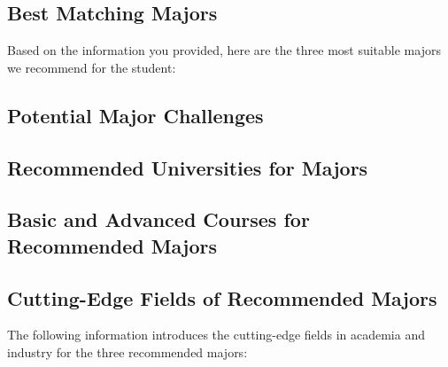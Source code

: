 \documentclass[12pt]{article}
\begin{document}
\begin{CJK*}{UTF8}{gbsn}
\newpage
\hspace{0pt}
\vspace{0cm}
\subsection*{Best Matching Majors}
Based on the information you provided, here are the three most suitable majors we recommend for the student:

\textbf{} %

\newpage
\hspace{0pt}
\vspace{0cm}
\subsection*{Potential Major Challenges}
\textbf{} %


\newpage
\hspace{0pt}
\vspace{0cm}
\subsection*{Recommended Universities for Majors}

\newpage
\hspace{0pt}
\vspace{0cm}
\subsection*{Basic and Advanced Courses for Recommended Majors}

\newpage
\hspace{0pt}
\vspace{0cm}
\subsection*{Cutting-Edge Fields of Recommended Majors}
The following information introduces the cutting-edge fields in academia and industry for the three recommended majors:

\newpage
\hspace{0pt}
\vspace{0cm}

\end{CJK*}
\end{document}

